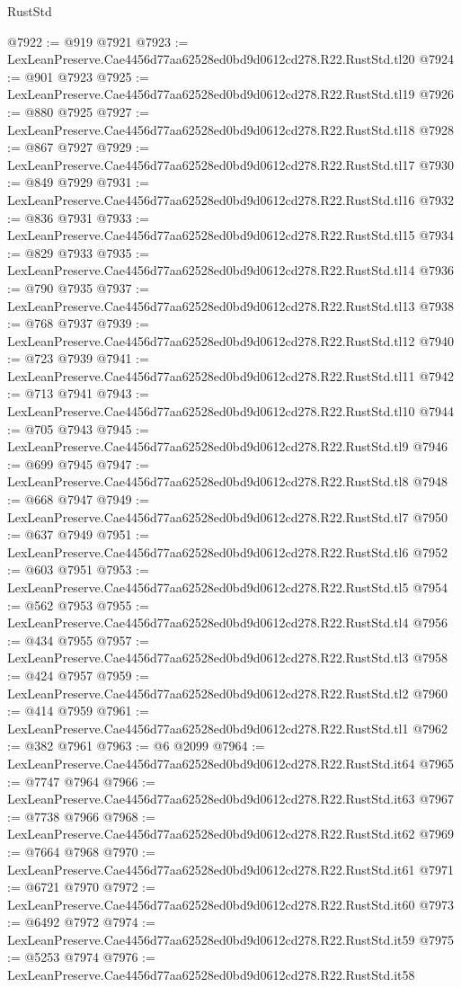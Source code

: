 \begin{lexlean}{RustStd}
\begin{coremodule}
@7922 := @919 @7921
@7923 := LexLeanPreserve.Cae4456d77aa62528ed0bd9d0612cd278.R22.RustStd.tl20
@7924 := @901 @7923
@7925 := LexLeanPreserve.Cae4456d77aa62528ed0bd9d0612cd278.R22.RustStd.tl19
@7926 := @880 @7925
@7927 := LexLeanPreserve.Cae4456d77aa62528ed0bd9d0612cd278.R22.RustStd.tl18
@7928 := @867 @7927
@7929 := LexLeanPreserve.Cae4456d77aa62528ed0bd9d0612cd278.R22.RustStd.tl17
@7930 := @849 @7929
@7931 := LexLeanPreserve.Cae4456d77aa62528ed0bd9d0612cd278.R22.RustStd.tl16
@7932 := @836 @7931
@7933 := LexLeanPreserve.Cae4456d77aa62528ed0bd9d0612cd278.R22.RustStd.tl15
@7934 := @829 @7933
@7935 := LexLeanPreserve.Cae4456d77aa62528ed0bd9d0612cd278.R22.RustStd.tl14
@7936 := @790 @7935
@7937 := LexLeanPreserve.Cae4456d77aa62528ed0bd9d0612cd278.R22.RustStd.tl13
@7938 := @768 @7937
@7939 := LexLeanPreserve.Cae4456d77aa62528ed0bd9d0612cd278.R22.RustStd.tl12
@7940 := @723 @7939
@7941 := LexLeanPreserve.Cae4456d77aa62528ed0bd9d0612cd278.R22.RustStd.tl11
@7942 := @713 @7941
@7943 := LexLeanPreserve.Cae4456d77aa62528ed0bd9d0612cd278.R22.RustStd.tl10
@7944 := @705 @7943
@7945 := LexLeanPreserve.Cae4456d77aa62528ed0bd9d0612cd278.R22.RustStd.tl9
@7946 := @699 @7945
@7947 := LexLeanPreserve.Cae4456d77aa62528ed0bd9d0612cd278.R22.RustStd.tl8
@7948 := @668 @7947
@7949 := LexLeanPreserve.Cae4456d77aa62528ed0bd9d0612cd278.R22.RustStd.tl7
@7950 := @637 @7949
@7951 := LexLeanPreserve.Cae4456d77aa62528ed0bd9d0612cd278.R22.RustStd.tl6
@7952 := @603 @7951
@7953 := LexLeanPreserve.Cae4456d77aa62528ed0bd9d0612cd278.R22.RustStd.tl5
@7954 := @562 @7953
@7955 := LexLeanPreserve.Cae4456d77aa62528ed0bd9d0612cd278.R22.RustStd.tl4
@7956 := @434 @7955
@7957 := LexLeanPreserve.Cae4456d77aa62528ed0bd9d0612cd278.R22.RustStd.tl3
@7958 := @424 @7957
@7959 := LexLeanPreserve.Cae4456d77aa62528ed0bd9d0612cd278.R22.RustStd.tl2
@7960 := @414 @7959
@7961 := LexLeanPreserve.Cae4456d77aa62528ed0bd9d0612cd278.R22.RustStd.tl1
@7962 := @382 @7961
@7963 := @6 @2099
@7964 := LexLeanPreserve.Cae4456d77aa62528ed0bd9d0612cd278.R22.RustStd.it64
@7965 := @7747 @7964
@7966 := LexLeanPreserve.Cae4456d77aa62528ed0bd9d0612cd278.R22.RustStd.it63
@7967 := @7738 @7966
@7968 := LexLeanPreserve.Cae4456d77aa62528ed0bd9d0612cd278.R22.RustStd.it62
@7969 := @7664 @7968
@7970 := LexLeanPreserve.Cae4456d77aa62528ed0bd9d0612cd278.R22.RustStd.it61
@7971 := @6721 @7970
@7972 := LexLeanPreserve.Cae4456d77aa62528ed0bd9d0612cd278.R22.RustStd.it60
@7973 := @6492 @7972
@7974 := LexLeanPreserve.Cae4456d77aa62528ed0bd9d0612cd278.R22.RustStd.it59
@7975 := @5253 @7974
@7976 := LexLeanPreserve.Cae4456d77aa62528ed0bd9d0612cd278.R22.RustStd.it58

\end{coremodule}
\end{lexlean}
